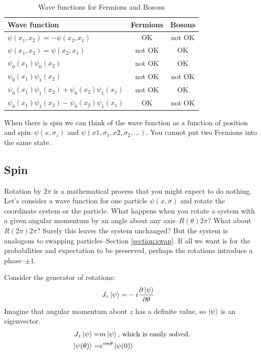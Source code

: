 \documentclass[]{article}
\begin{document}
\begin{table}[H]
	\begin{center}
		\caption{Wave functions for Fermions and Bosons}
			\begin{tabular}{|l| c| c|} \hline 
				Wave function&Fermions&Bosons \\ \hline 
				$\psi(x_1,x_2)=-\psi(x_2,x_1)$&OK&not OK\\ \hline
				$\psi(x_1,x_2)=\psi(x_2,x_1)$&not OK& OK\\ \hline
				$\psi_0(x_1)\psi_0(x_2)$&not OK& OK\\ \hline
				$\psi_0(x_1)\psi_1(x_2)$&not OK& not OK\\ \hline
				$\psi_0(x_1)\psi_1(x_2)+\psi_0(x_2)\psi_1(x_1)$&not OK& OK\\ \hline
				$\psi_0(x_1)\psi_1(x_2)-\psi_0(x_2)\psi_1(x_1)$&OK&not OK \\ \hline
		\end{tabular}
	\end{center}
\end{table}

When there is spin we can think of the wave function as a function of position and spin--$\psi(x,\sigma_z)$ and $\psi(x1,\sigma_1,x2,\sigma_2,...)$. You cannot put two Fermions into the same state.

\subsection{Spin}\label{section:spin}

Rotation by $2\pi$ is a mathematical process that you might expect to do nothing. Let's consider a wave function for one particle $\psi(x,\sigma)$ and rotate the coordinate system or the particle. What happens when you rotate a system with a given angular momentum by an angle about any axis--$R(\theta)2\pi$? What about $R(2\pi)2\pi$? Surely this leaves the system unchanged? But the system is analogous to swapping particles--Section \ref{section:swap}. If all we want is for the probabilities and expectation to be preserved, perhaps the rotations introduce a phase--$\pm1$.

Consider the generator of rotations:
\begin{align*}
	J_z\ket{\psi} =& -i \frac{\partial \ket{\psi}}{\partial \theta}
\end{align*}
Imagine that angular momentum about $z$ has a definite value, so $\ket{\psi}$ is an eigenvector.
\begin{align*}
	J_z\ket{\psi}=& m\ket{\psi} \text{, which is easily solved.}\\
	\ket{\psi(\theta)} =& e^{im\theta}\ket{\psi(0)}
\end{align*}
\end{document}
